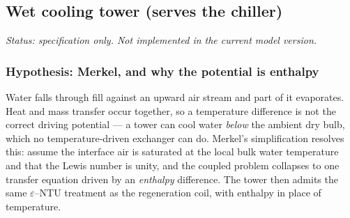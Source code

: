 \subsection{Wet cooling tower (serves the chiller)}
\label{sec:spec:tower}

\emph{Status: specification only. Not implemented in the current model version.}

\subsubsection{Hypothesis: Merkel, and why the potential is enthalpy}
Water falls through fill against an upward air stream and part of it evaporates. Heat and mass
transfer occur together, so a temperature difference is not the correct driving potential --- a tower
can cool water \emph{below} the ambient dry bulb, which no temperature-driven exchanger can do.
Merkel's simplification resolves this: assume the interface air is saturated at the local bulk water
temperature and that the Lewis number is unity, and the coupled problem collapses to one transfer
equation driven by an \emph{enthalpy} difference. The tower then admits the same
$\varepsilon$--$\mathrm{NTU}$ treatment as the regeneration coil, with enthalpy in place of
temperature.

